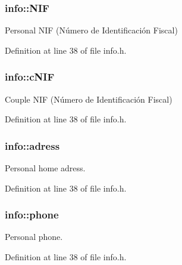 \hypertarget{structinfo_a68e2c3e3e7e8e6df17e1f5b466506319}{
\subsubsection[{N\+I\+F}]{\setlength{\rightskip}{0pt plus 5cm}info\+::\+N\+I\+F}}\label{structinfo_a68e2c3e3e7e8e6df17e1f5b466506319}


Personal N\+I\+F (Número de Identificación Fiscal) 



Definition at line 38 of file info.\+h.

\hypertarget{structinfo_a46ee4d6a7e5976d795ed9efa02341fce}{
\subsubsection[{c\+N\+I\+F}]{\setlength{\rightskip}{0pt plus 5cm}info\+::c\+N\+I\+F}}\label{structinfo_a46ee4d6a7e5976d795ed9efa02341fce}


Couple N\+I\+F (Número de Identificación Fiscal) 



Definition at line 38 of file info.\+h.

\hypertarget{structinfo_a589dff7ad548e9ac9a45f632539c9a0a}{
\subsubsection[{adress}]{\setlength{\rightskip}{0pt plus 5cm}info\+::adress}}\label{structinfo_a589dff7ad548e9ac9a45f632539c9a0a}


Personal home adress. 



Definition at line 38 of file info.\+h.

\hypertarget{structinfo_a716fe5520eb096be308dcd18f7cbd1c1}{
\subsubsection[{phone}]{\setlength{\rightskip}{0pt plus 5cm}info\+::phone}}\label{structinfo_a716fe5520eb096be308dcd18f7cbd1c1}


Personal phone. 



Definition at line 38 of file info.\+h.


